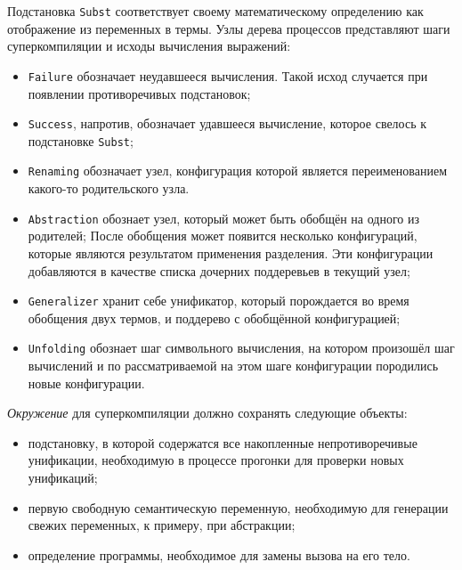 Подстановка \lstinline{Subst} соответствует своему математическому определению как отображение из
переменных в термы.
Узлы дерева процессов представляют шаги суперкомпиляции и исходы вычисления выражений:
\begin{itemize}
\item \lstinline{Failure} обозначает неудавшееся вычисления. Такой исход
      случается при появлении противоречивых подстановок;
\item \lstinline{Success}, напротив, обозначает удавшееся вычисление, которое свелось к подстановке \lstinline{Subst};
\item \lstinline{Renaming} обозначает узел, конфигурация которой является переименованием какого-то родительского узла.
\item \lstinline{Abstraction} обознает узел, который может быть обобщён на одного из родителей;
      После обобщения может появится несколько конфигураций, которые являются результатом применения разделения.
      Эти конфигурации добавляются в качестве списка дочерних поддеревьев в текущий узел;
\item \lstinline{Generalizer} хранит себе унификатор, который порождается во время обобщения
      двух термов, и поддерево с обобщённой конфигурацией;
\item \lstinline{Unfolding} обознает шаг символьного вычисления, на котором произошёл шаг вычислений
      и по рассматриваемой на этом шаге конфигурации породились новые конфигурации.
\end{itemize}


\emph{Окружение} для суперкомпиляции должно сохранять следующие объекты:
\begin{itemize}
\item подстановку, в которой содержатся все накопленные непротиворечивые унификации,
      необходимую в процессе прогонки для проверки новых унификаций;
\item первую свободную семантическую переменную, необходимую для генерации свежих переменных,
      к примеру, при абстракции;
\item определение программы, необходимое для замены вызова на его тело.
\end{itemize}

